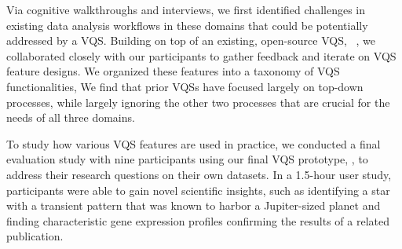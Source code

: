 \par Via cognitive walkthroughs and interviews, we first identified challenges in existing data analysis workflows in these domains
that could be potentially addressed by a VQS. Building on top of an existing, open-source VQS, \zv~\cite{Siddiqui2017,Siddiqui2017VLDB}, we collaborated closely with our participants to gather feedback and iterate on VQS feature designs. We organized these features into a taxonomy of VQS functionalities,  We find that prior VQSs have focused largely on top-down processes, while largely ignoring the other two processes that are crucial for the needs of all three domains.

\par 
To study how various VQS features 
are used in practice, 
we conducted a final evaluation study with nine participants 
using our final VQS prototype, \zvpp, 
to address their research questions 
on their own datasets. 
In a 1.5-hour user study, participants were able to 
gain novel scientific insights, 
such as identifying a star with a transient pattern 
that was known to harbor a Jupiter-sized planet 
and finding characteristic gene expression profiles confirming the results of a related publication.  

